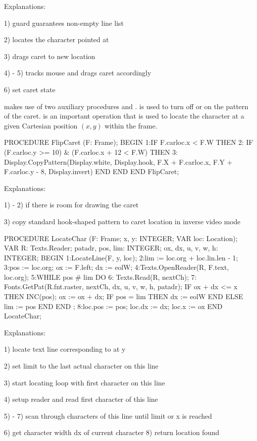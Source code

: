 \noindent Explanations:

1) guard guarantees non-empty line list

2) locates the character pointed at

3) drags caret to new location

4) - 5) tracks mouse and drags caret accordingly

6) set caret state

 makes use of two auxiliary procedures  and .  is used to turn off or on the pattern of the caret.  is an important operation that is used to locate the character at a given Cartesian position $(x, y)$ within the frame.

\begintt
PROCEDURE FlipCaret (F: Frame);
BEGIN
1:IF F.carloc.x < F.W THEN
2:  IF (F.carloc.y >= 10) & (F.carloc.x + 12 < F.W) THEN
3:    Display.CopyPattern(Display.white, Display.hook,
        F.X + F.carloc.x, F.Y + F.carloc.y - 8, Display.invert)
    END
  END
END FlipCaret;
\endtt

Explanations:

1) - 2) if there is room for drawing the caret

3) copy standard hook-shaped pattern to caret location in inverse video mode

\begintt
PROCEDURE LocateChar (F: Frame; x, y: INTEGER; VAR loc: Location);
VAR R: Texts.Reader;
    patadr, pos, lim: INTEGER;
    ox, dx, u, v, w, h: INTEGER;
BEGIN
1:LocateLine(F, y, loc);
2:lim := loc.org + loc.lin.len - 1;
3:pos := loc.org; ox := F.left; dx := eolW;
4:Texts.OpenReader(R, F.text, loc.org);
5:WHILE pos # lim DO
6:  Texts.Read(R, nextCh);
7:  Fonts.GetPat(R.fnt.raster, nextCh, dx, u, v, w, h, patadr);
    IF ox + dx <= x THEN
      INC(pos); ox := ox + dx;
      IF pos = lim THEN dx := eolW END
      ELSE lim := pos
    END
  END ;
8:loc.pos := pos; loc.dx := dx; loc.x := ox
END LocateChar;
\endtt

Explanations:

1) locate text line corresponding to at y

2) set limit to the last actual character on this line

3) start locating loop with first character on this line

4) setup reader and read first character of this line

5) - 7) scan through characters of this line until limit or x is reached

6) get character width dx of current character 8) return location found

